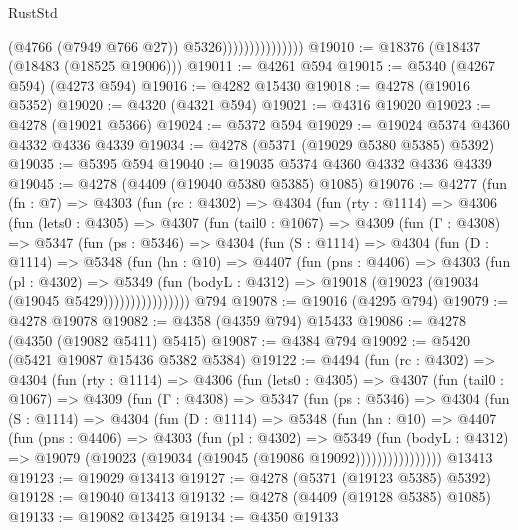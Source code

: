 \begin{lexlean}{RustStd}
\begin{coremodule}
{\begin{coremodule}
{{{{{{{{{{{{{{{{{{{{{{{{{{{{{{{{{{{                                  (@4766 (@7949 @766 @27))
                                  @5326)))))))))))))))
@19010 := @18376 (@18437 (@18483 (@18525 @19006)))
@19011 := @4261 @594
@19015 := @5340 (@4267 @594) (@4273 @594)
@19016 := @4282 @15430
@19018 := @4278 (@19016 @5352)
@19020 := @4320 (@4321 @594)
@19021 := @4316 @19020
@19023 := @4278 (@19021 @5366)
@19024 := @5372 @594
@19029 := @19024 @5374 @4360 @4332 @4336 @4339
@19034 := @4278 (@5371 (@19029 @5380 @5385) @5392)
@19035 := @5395 @594
@19040 := @19035 @5374 @4360 @4332 @4336 @4339
@19045 := @4278 (@4409 (@19040 @5380 @5385) @1085)
@19076 := @4277
    (fun (fn : @7) =>
    @4303
      (fun (rc : @4302) =>
      @4304
        (fun (rty : @1114) =>
        @4306
          (fun (lets0 : @4305) =>
          @4307
            (fun (tail0 : @1067) =>
            @4309
              (fun (Γ : @4308) =>
              @5347
                (fun (ps : @5346) =>
                @4304
                  (fun (S : @1114) =>
                  @4304
                    (fun (D : @1114) =>
                    @5348
                      (fun (hn : @10) =>
                      @4407
                        (fun (pns : @4406) =>
                        @4303
                          (fun (pl : @4302) =>
                          @5349
                            (fun (bodyL : @4312) =>
                            @19018 (@19023 (@19034 (@19045 @5429))))))))))))))))
    @794
@19078 := @19016 (@4295 @794)
@19079 := @4278 @19078
@19082 := @4358 (@4359 @794) @15433
@19086 := @4278 (@4350 (@19082 @5411) @5415)
@19087 := @4384 @794
@19092 := @5420 (@5421 @19087 @15436 @5382 @5384)
@19122 := @4494
    (fun (rc : @4302) =>
    @4304
      (fun (rty : @1114) =>
      @4306
        (fun (lets0 : @4305) =>
        @4307
          (fun (tail0 : @1067) =>
          @4309
            (fun (Γ : @4308) =>
            @5347
              (fun (ps : @5346) =>
              @4304
                (fun (S : @1114) =>
                @4304
                  (fun (D : @1114) =>
                  @5348
                    (fun (hn : @10) =>
                    @4407
                      (fun (pns : @4406) =>
                      @4303
                        (fun (pl : @4302) =>
                        @5349
                          (fun (bodyL : @4312) =>
                          @19079 (@19023 (@19034 (@19045 (@19086 @19092))))))))))))))))
    @13413
@19123 := @19029 @13413
@19127 := @4278 (@5371 (@19123 @5385) @5392)
@19128 := @19040 @13413
@19132 := @4278 (@4409 (@19128 @5385) @1085)
@19133 := @19082 @13425
@19134 := @4350 @19133
}}}}}}}}}}}}}}}}}}}}}}}}}}}}}}}}}}}
\end{coremodule}}
\end{coremodule}
\end{lexlean}
